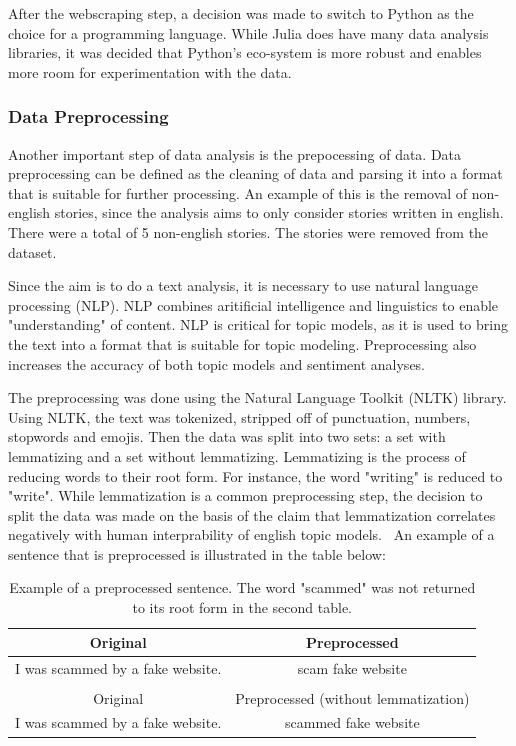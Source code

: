 After the webscraping step, a decision was made to switch to Python as the choice for a programming language. While Julia does have many data analysis libraries, it was decided that Python's eco-system is more robust and enables more room for experimentation with the data. 

\subsubsection{Data Preprocessing}

Another important step of data analysis is the prepocessing of data. Data preprocessing can be defined as the cleaning of data and parsing it into a format that is suitable for further processing. An example of this is the removal of non-english stories, since the analysis aims to only consider stories written in english. There were a total of 5 non-english stories. The stories were removed from the dataset.

Since the aim is to do a text analysis, it is necessary to use natural language processing (NLP). NLP combines aritificial intelligence and linguistics to enable "understanding" of content. NLP is critical for topic models, as it is used to bring the text into a format that is suitable for topic modeling. Preprocessing also increases the accuracy of both topic models and sentiment analyses.~\cite{haddi2013role}\cite{chauhan2021topic}

The preprocessing was done using the Natural Language Toolkit (NLTK) library. Using NLTK, the text was tokenized, stripped off of punctuation, numbers, stopwords and emojis. Then the data was split into two sets: a set with lemmatizing and a set without lemmatizing. Lemmatizing is the process of reducing words to their root form. For instance, the word "writing" is reduced to "write". While lemmatization is a common preprocessing step, the decision to split the data was made on the basis of the claim that lemmatization correlates negatively with human interprability of english topic models.~\cite{schofield2016comparing} An example of a sentence that is preprocessed is illustrated in the table below:


\begin{table}[h]
    \centering
    \begin{tabular}{cc}
        Original & Preprocessed \\ \hline
        I was scammed by a fake website. & scam fake website \\
        \\
        Original & Preprocessed (without lemmatization) \\ \hline
        I was scammed by a fake website. & scammed fake website \\
    \end{tabular}
    \caption{Example of a preprocessed sentence. The word "scammed" was not returned to its root form in the second table.}
    \label{tab:preprocessing}
\end{table}

